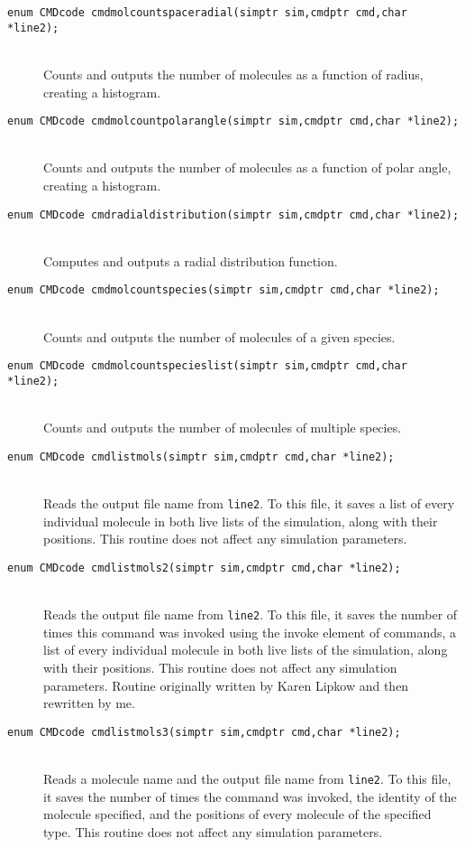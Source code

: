 \documentclass {scrbook}
\newcommand {\ttt} {\texttt}
\begin{document}
\begin{description}
\item[\ttt{enum CMDcode cmdmolcountspaceradial(simptr sim,cmdptr cmd,char *line2);}]
\hfill \\
Counts and outputs the number of molecules as a function of radius, creating a histogram.

\item[\ttt{enum CMDcode cmdmolcountpolarangle(simptr sim,cmdptr cmd,char *line2);}]
\hfill \\
Counts and outputs the number of molecules as a function of polar angle, creating a histogram.

\item[\ttt{enum CMDcode cmdradialdistribution(simptr sim,cmdptr cmd,char *line2);}]
\hfill \\
Computes and outputs a radial distribution function.

\item[\ttt{enum CMDcode cmdmolcountspecies(simptr sim,cmdptr cmd,char *line2);}]
\hfill \\
Counts and outputs the number of molecules of a given species.

\item[\ttt{enum CMDcode cmdmolcountspecieslist(simptr sim,cmdptr cmd,char *line2);}]
\hfill \\
Counts and outputs the number of molecules of multiple species.

\item[\ttt{enum CMDcode cmdlistmols(simptr sim,cmdptr cmd,char *line2);}]
\hfill \\
Reads the output file name from \ttt{line2}. To this file, it saves a list of every individual molecule in both live lists of the simulation, along with their positions. This routine does not affect any simulation parameters.

\item[\ttt{enum CMDcode cmdlistmols2(simptr sim,cmdptr cmd,char *line2);}]
\hfill \\
Reads the output file name from \ttt{line2}. To this file, it saves the number of times this command was invoked using the invoke element of commands, a list of every individual molecule in both live lists of the simulation, along with their positions. This routine does not affect any simulation parameters. Routine originally written by Karen Lipkow and then rewritten by me.

\item[\ttt{enum CMDcode cmdlistmols3(simptr sim,cmdptr cmd,char *line2);}]
\hfill \\
Reads a molecule name and the output file name from \ttt{line2}. To this file, it saves the number of times the command was invoked, the identity of the molecule specified, and the positions of every molecule of the specified type. This routine does not affect any simulation parameters.


\end{description}
\end{document}
